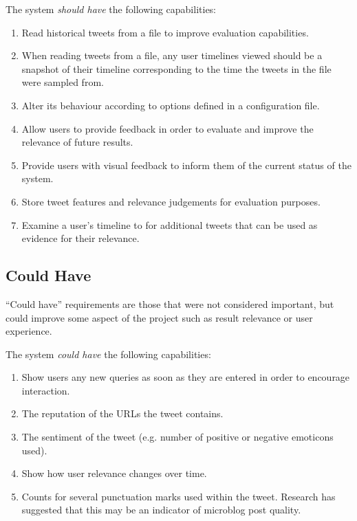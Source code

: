 \documentclass{l4proj}
\begin{document}
        The system \textit{should have} the following capabilities:
        
        \begin{enumerate}
        \item Read historical tweets from a file to improve evaluation capabilities.
        \item When reading tweets from a file, any user timelines viewed should be a snapshot of their timeline corresponding to the time the tweets in the file were sampled from.
        \item Alter its behaviour according to options defined in a configuration file.
        \item Allow users to provide feedback in order to evaluate and improve the relevance of future results.
        \item Provide users with visual feedback to inform them of the current status of the system.
        \item Store tweet features and relevance judgements for evaluation purposes.
        \item Examine a user's timeline to for additional tweets that can be used as evidence for their relevance.
        \end{enumerate}

        \subsection{Could Have}
        ``Could have'' requirements are those that were not considered important, but could improve some aspect of the project such as result relevance or user experience.
        
        The system \textit{could have} the following capabilities:
        
        \begin{enumerate}
        \item Show users any new queries as soon as they are entered in order to encourage interaction.
        \item The reputation of the URLs the tweet contains.
        \item The sentiment of the tweet (e.g. number of positive or negative emoticons used).
        \item Show how user relevance changes over time.
        \item Counts for several punctuation marks used within the tweet. Research has suggested that this may be an indicator of microblog post quality. %
        \end{enumerate}
        
\end{document}
